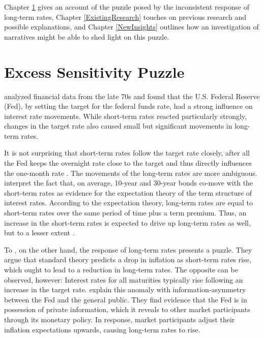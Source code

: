 \documentclass[11pt,a4paper,english,oneside]{book}
\numberwithin{equation}{chapter}
\begin{document}
Chapter \ref{SensitivityPuzzle} gives an account of the puzzle posed by the inconsistent response of long-term rates, Chapter \ref{ExistingResearch} touches on previous research and possible explanations, and Chapter  \ref{NewInsights} outlines how an investigation of narratives might be able to shed light on this puzzle.


\section{Excess Sensitivity Puzzle} \label{SensitivityPuzzle}

\cite{Cook.1989} analyzed financial data from the late 70s and found that the U.S. Federal Reserve (Fed), by setting the target for the federal funds rate, had a strong influence on interest rate movements. While short-term rates reacted particularly strongly, changes in the target rate also caused small but significant movements in long-term rates. 
 
It is not surprising that short-term rates follow the target rate closely, after all the Fed keeps the overnight rate close to the target and thus directly influences the one-month rate \citep[p. 1]{Ellingsen.2003}. The movements of the long-term rates are more ambiguous. \citet[p. 343--346]{Cook.1989} interpret the fact that, on average, 10-year and 30-year bonds co-move with the short-term rates as evidence for the expectation theory of the term structure of interest rates. According to the expectation theory, long-term rates are equal to short-term rates over the same period of time plus a term premium. Thus, an increase in the short-term rates is expected to drive up long-term rates as well, but to a lesser extent \citep[p. 1594]{Ellingsen.2001}.

To \cite{Romer.2000}, on the other hand, the response of long-term rates presents a puzzle. They argue that standard theory predicts a drop in inflation as short-term rates rise, which ought to lead to a reduction in long-term rates. The opposite can be observed, however: Interest rates for all maturities typically rise following an increase in the target rate. \cite{Romer.2000} explain this anomaly with information-asymmetry between the Fed and the general public. They find evidence that the Fed is in possession of private information, which it reveals to other market participants through its monetary policy. In response, market participants adjust their inflation expectations upwards, causing long-term rates to rise.
\end{document}
